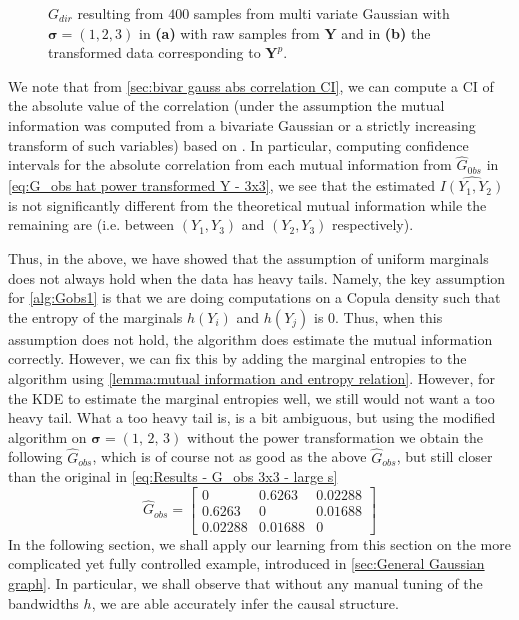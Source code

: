 \documentclass[../Thesis.tex]{subfiles}
\begin{document}
\begin{figure}[H]
\begin{subfigure}[t]{0.49\textwidth}
        \caption{}
        \label{fig:Gaussian 3x3 large s power}
    \end{subfigure}
    \caption{$G_{dir}$ resulting from $400$ samples from multi variate Gaussian with $\boldsymbol\sigma = (1,2,3)$ in \textbf{(a)} with raw samples from $\boldsymbol Y$ and in \textbf{(b)} the transformed data corresponding to $\boldsymbol Y^p$.}
    \label{fig:Gaussian 3x3 large s G_dir differences}
\end{figure}

We note that from \autoref{sec:bivar gauss abs correlation CI}, we can compute a CI of the absolute value of the correlation (under the assumption the mutual information was computed from a bivariate Gaussian or a strictly increasing transform of such variables) based on \cite{Confidence_in_Correlation}. In particular, computing confidence intervals for the absolute correlation from each mutual information from $\hat{G}_{0bs}$ in \autoref{eq:G_obs hat power transformed Y - 3x3}, we see that the estimated $\widehat{I\left(Y_1,Y_2\right)}$ is not significantly different from the theoretical mutual information while the remaining are (i.e. between $(Y_1,Y_3)$ and $(Y_2,Y_3)$ respectively).

Thus, in the above, we have showed that the assumption of uniform marginals does not always hold when the data has heavy tails. Namely, the key assumption for \autoref{alg:Gobs1} is that we are doing computations on a Copula density such that the entropy of the marginals $h\left(Y_i\right)$ and $h\left(Y_j\right)$ is $0$. Thus, when this assumption does not hold, the algorithm does estimate the mutual information correctly. However, we can fix this by adding the marginal entropies to the algorithm using \autoref{lemma:mutual information and entropy relation}. However, for the KDE to estimate the marginal entropies well, we still would not want a too heavy tail. What a too heavy tail is, is a bit ambiguous, but using the modified algorithm on $\boldsymbol \sigma = \left(1,\, 2,\, 3\right)$ without the power transformation we obtain the following $\hat{G}_{obs}$, which is of course not as good as the above $\hat{G}_{obs}$, but still closer than the original in \autoref{eq:Results - G_obs 3x3 - large s}
$$\hat{G}_{obs} = \begin{bmatrix}
    0 & 0.6263 & 0.02288\\
    0.6263 & 0 & 0.01688\\
    0.02288 & 0.01688 & 0
\end{bmatrix}$$
In the following section, we shall apply our learning from this section on the more complicated yet fully controlled example, introduced in \autoref{sec:General Gaussian graph}. In particular, we shall observe that without any manual tuning of the bandwidths $h$, we are able accurately infer the causal structure.
\end{document}
